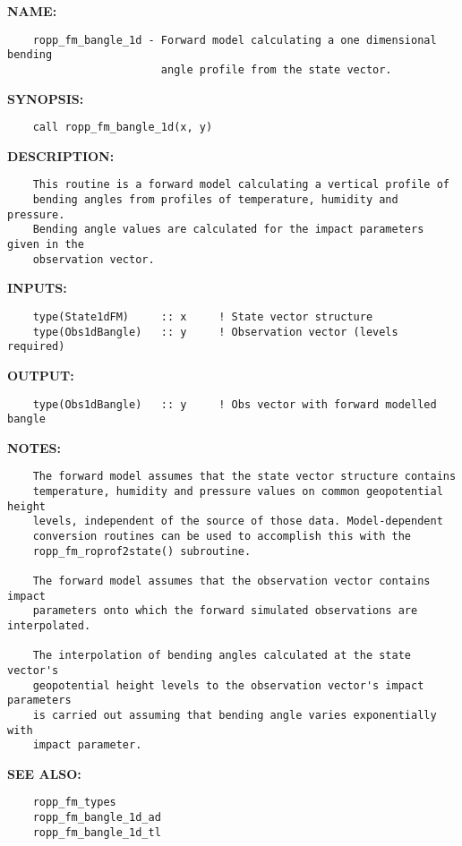 \label{ch:robo3}
\label{ch:BendingAngle_ropp_fm_bangle_1d}
\textbf{NAME:}\hspace{0.08in}\begin{Verbatim}
    ropp_fm_bangle_1d - Forward model calculating a one dimensional bending
                        angle profile from the state vector.
\end{Verbatim}
\textbf{SYNOPSIS:}\hspace{0.08in}\begin{Verbatim}
    call ropp_fm_bangle_1d(x, y)
\end{Verbatim}
\textbf{DESCRIPTION:}\hspace{0.08in}\begin{Verbatim}
    This routine is a forward model calculating a vertical profile of 
    bending angles from profiles of temperature, humidity and pressure. 
    Bending angle values are calculated for the impact parameters given in the
    observation vector.
\end{Verbatim}
\textbf{INPUTS:}\hspace{0.08in}\begin{Verbatim}
    type(State1dFM)     :: x     ! State vector structure
    type(Obs1dBangle)   :: y     ! Observation vector (levels required)
\end{Verbatim}
\textbf{OUTPUT:}\hspace{0.08in}\begin{Verbatim}
    type(Obs1dBangle)   :: y     ! Obs vector with forward modelled bangle
\end{Verbatim}
\textbf{NOTES:}\hspace{0.08in}\begin{Verbatim}
    The forward model assumes that the state vector structure contains 
    temperature, humidity and pressure values on common geopotential height 
    levels, independent of the source of those data. Model-dependent 
    conversion routines can be used to accomplish this with the 
    ropp_fm_roprof2state() subroutine.

    The forward model assumes that the observation vector contains impact
    parameters onto which the forward simulated observations are interpolated.

    The interpolation of bending angles calculated at the state vector's
    geopotential height levels to the observation vector's impact parameters 
    is carried out assuming that bending angle varies exponentially with
    impact parameter.
\end{Verbatim}
\textbf{SEE ALSO:}\hspace{0.08in}\begin{Verbatim}
    ropp_fm_types
    ropp_fm_bangle_1d_ad
    ropp_fm_bangle_1d_tl
\end{Verbatim}
